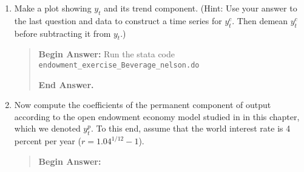 \begin{exercise}
\begin{enumerate}
\begin{quote}
{\bf End Answer.}
\end{quote}

\item  Make a plot showing $y_t$ and its trend component. 
(Hint: Use your answer to the last question and data to construct a time series for $y^c_t$. Then   demean $y^c_t$  before subtracting it from $y_t$.) 

\begin{quote}
{\bf Begin Answer: }
Run the stata code \verb?endowment_exercise_Beverage_nelson.do ?

{\bf End Answer.}
\end{quote}

\item Now  compute the  coefficients of the permanent component of output according to the open  endowment economy model studied in 
in this chapter, which we denoted $y^p_t$. To this end, assume that the world interest rate is 4 percent per year
 ($r= 1.04^{1/12}-1$). 
\begin{quote}
{\bf Begin Answer: }


\end{quote}
\end{enumerate}
\end{exercise}
